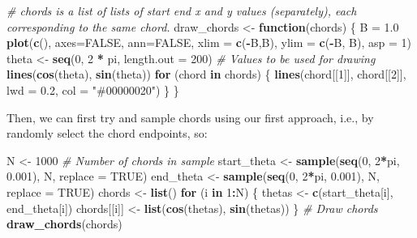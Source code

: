 \documentclass[
]{article}
\newenvironment{Shaded}{\begin{snugshade}}{\end{snugshade}}
\newcommand{\AttributeTok}[1]{\textcolor[rgb]{0.13,0.29,0.53}{#1}}
\newcommand{\CommentTok}[1]{\textcolor[rgb]{0.56,0.35,0.01}{\textit{#1}}}
\newcommand{\ConstantTok}[1]{\textcolor[rgb]{0.56,0.35,0.01}{#1}}
\newcommand{\ControlFlowTok}[1]{\textcolor[rgb]{0.13,0.29,0.53}{\textbf{#1}}}
\newcommand{\DecValTok}[1]{\textcolor[rgb]{0.00,0.00,0.81}{#1}}
\newcommand{\FloatTok}[1]{\textcolor[rgb]{0.00,0.00,0.81}{#1}}
\newcommand{\FunctionTok}[1]{\textcolor[rgb]{0.13,0.29,0.53}{\textbf{#1}}}
\newcommand{\NormalTok}[1]{#1}
\newcommand{\OtherTok}[1]{\textcolor[rgb]{0.56,0.35,0.01}{#1}}
\newcommand{\SpecialCharTok}[1]{\textcolor[rgb]{0.81,0.36,0.00}{\textbf{#1}}}
\newcommand{\StringTok}[1]{\textcolor[rgb]{0.31,0.60,0.02}{#1}}
\begin{document}
\begin{Shaded}
\begin{Highlighting}[]
\CommentTok{\# \textasciigrave{}chords\textasciigrave{} is a list of lists of start end x and y values (separately), each corresponding to the same chord.}
\NormalTok{draw\_chords }\OtherTok{\textless{}{-}} \ControlFlowTok{function}\NormalTok{(chords) \{}
\NormalTok{  B }\OtherTok{=} \FloatTok{1.0}
  \FunctionTok{plot}\NormalTok{(}\FunctionTok{c}\NormalTok{(), }\AttributeTok{axes=}\ConstantTok{FALSE}\NormalTok{, }\AttributeTok{ann=}\ConstantTok{FALSE}\NormalTok{, }\AttributeTok{xlim =} \FunctionTok{c}\NormalTok{(}\SpecialCharTok{{-}}\NormalTok{B,B), }\AttributeTok{ylim  =} \FunctionTok{c}\NormalTok{(}\SpecialCharTok{{-}}\NormalTok{B, B), }\AttributeTok{asp =} \DecValTok{1}\NormalTok{)}
\NormalTok{  theta }\OtherTok{\textless{}{-}} \FunctionTok{seq}\NormalTok{(}\DecValTok{0}\NormalTok{, }\DecValTok{2} \SpecialCharTok{*}\NormalTok{ pi, }\AttributeTok{length.out =} \DecValTok{200}\NormalTok{) }\CommentTok{\# Values to be used for drawing}
  \FunctionTok{lines}\NormalTok{(}\FunctionTok{cos}\NormalTok{(theta), }\FunctionTok{sin}\NormalTok{(theta))}
  \ControlFlowTok{for}\NormalTok{ (chord }\ControlFlowTok{in}\NormalTok{ chords) \{}
    \FunctionTok{lines}\NormalTok{(chord[[}\DecValTok{1}\NormalTok{]], chord[[}\DecValTok{2}\NormalTok{]], }\AttributeTok{lwd =} \FloatTok{0.2}\NormalTok{, }\AttributeTok{col =} \StringTok{"\#00000020"}\NormalTok{)}
\NormalTok{  \}}
\NormalTok{\}}
\end{Highlighting}
\end{Shaded}

Then, we can first try and sample chords using our first approach, i.e.,
by randomly select the chord endpoints, so:

\begin{Shaded}
\begin{Highlighting}[]
\NormalTok{N }\OtherTok{\textless{}{-}} \DecValTok{1000} \CommentTok{\# Number of chords in sample}
\NormalTok{start\_theta }\OtherTok{\textless{}{-}} \FunctionTok{sample}\NormalTok{(}\FunctionTok{seq}\NormalTok{(}\DecValTok{0}\NormalTok{, }\DecValTok{2}\SpecialCharTok{*}\NormalTok{pi, }\FloatTok{0.001}\NormalTok{), N, }\AttributeTok{replace =} \ConstantTok{TRUE}\NormalTok{)}
\NormalTok{end\_theta }\OtherTok{\textless{}{-}} \FunctionTok{sample}\NormalTok{(}\FunctionTok{seq}\NormalTok{(}\DecValTok{0}\NormalTok{, }\DecValTok{2}\SpecialCharTok{*}\NormalTok{pi, }\FloatTok{0.001}\NormalTok{), N, }\AttributeTok{replace =} \ConstantTok{TRUE}\NormalTok{)}
\NormalTok{chords }\OtherTok{\textless{}{-}} \FunctionTok{list}\NormalTok{()}
\ControlFlowTok{for}\NormalTok{ (i }\ControlFlowTok{in} \DecValTok{1}\SpecialCharTok{:}\NormalTok{N) \{}
\NormalTok{  thetas }\OtherTok{\textless{}{-}} \FunctionTok{c}\NormalTok{(start\_theta[i], end\_theta[i])}
\NormalTok{  chords[[i]] }\OtherTok{\textless{}{-}} \FunctionTok{list}\NormalTok{(}\FunctionTok{cos}\NormalTok{(thetas), }\FunctionTok{sin}\NormalTok{(thetas))}
\NormalTok{\}}
\CommentTok{\# Draw chords}
\FunctionTok{draw\_chords}\NormalTok{(chords)}
\end{Highlighting}
\end{Shaded}
\end{document}
